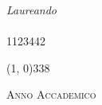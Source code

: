 \begin{titlepage}
\begin{center}
\begin{large}
\vspace{0pt}

\begin{flushright}
\textit{Laureando}\\
\vspace{5pt}
\myName\\
\vspace{5pt}
1123442
\end{flushright}
\end{large}

\vspace{20pt}

\line(1, 0){338} \\
\begin{normalsize}
\textsc{Anno Accademico \myAA}
\end{normalsize}

\end{center}
\end{titlepage}